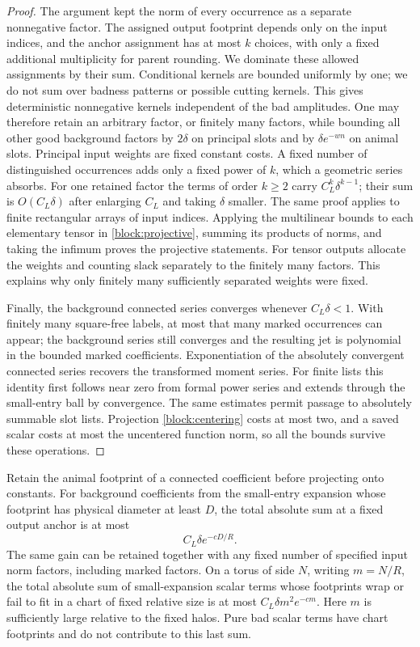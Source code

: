 \begin{proof}
The argument kept the norm of every occurrence as a separate
nonnegative factor.  The assigned output footprint depends only on
the input indices, and the anchor assignment has at most $k$ choices,
with only a fixed additional multiplicity for parent rounding.
We dominate these allowed assignments by their sum.  Conditional
kernels are bounded uniformly by one; we do not sum over badness
patterns or possible cutting kernels.  This gives deterministic
nonnegative kernels independent of the bad amplitudes.  One may
therefore retain an arbitrary factor, or finitely many factors,
while bounding all other good background factors by
$2\delta$ on principal slots and by
$\delta e^{-wn}$ on animal slots.  Principal input weights are fixed
constant costs.  A fixed number of distinguished occurrences adds
only a fixed power of $k$, which a geometric series absorbs.  For
one retained factor the terms of order $k\ge2$ carry
$C_L^k\delta^{k-1}$; their sum is $O(C_L\delta)$ after enlarging
$C_L$ and taking $\delta$ smaller.  The same proof applies to finite
rectangular arrays of input indices.  Applying the multilinear
bounds to each elementary tensor in \eqref{block:projective}, summing
its products of norms, and taking the infimum proves the projective
statements.  For tensor outputs allocate the weights and counting
slack separately to the finitely many factors.  This explains why
only finitely many sufficiently separated weights were fixed.

Finally, the background connected series converges whenever
$C_L\delta<1$.  With finitely many square-free labels, at most that
many marked occurrences can appear; the background series still
converges and the resulting jet is polynomial in the bounded marked
coefficients.  Exponentiation of the absolutely convergent connected
series recovers the transformed moment series.  For finite lists this
identity first follows near zero from formal power series and extends
through the small-entry ball by convergence.  The same estimates
permit passage to absolutely summable slot lists.  Projection
\eqref{block:centering} costs at most two, and a saved scalar costs at
most the uncentered function norm, so all the bounds survive these
operations.
\end{proof}

\begin{corollary}
\label{block:diameter}
Retain the animal footprint of a connected coefficient before projecting
onto constants.  For background coefficients from the small-entry
expansion whose footprint has physical diameter at least $D$, the total
absolute sum at a fixed output anchor is at most
\[
 C_L\delta e^{-cD/R}.
\]
The same gain can be retained together with any fixed number of
specified input norm factors, including marked factors.  On a torus of
side $N$, writing $m=N/R$, the total absolute sum of small-expansion
scalar terms whose footprints wrap or fail to fit in a chart of fixed
relative size is at most $C_L\delta m^2e^{-cm}$.  Here $m$ is sufficiently
large relative to the fixed halos.  Pure bad scalar terms have chart
footprints and do not contribute to this last sum.
\end{corollary}

